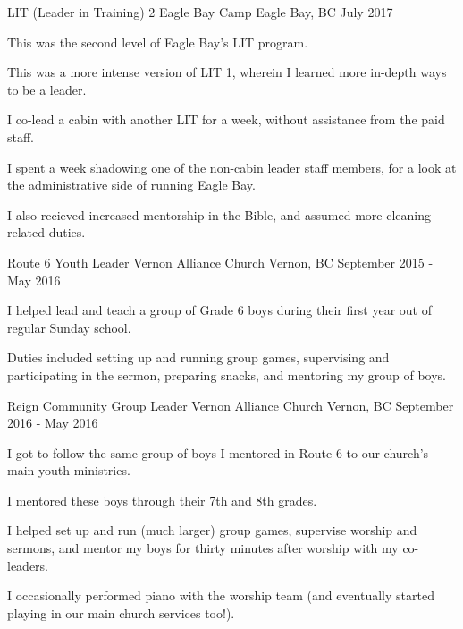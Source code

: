 \begin{cventries}
  \cventry
    {LIT (Leader in Training) 2} %
    {Eagle Bay Camp} %
    {Eagle Bay, BC} %
    {July 2017} %
    {
      \begin{cvitems} %
        \item{This was the second level of Eagle Bay's LIT program.}
        \item{This was a more intense version of LIT 1, wherein I learned more in-depth ways to be a leader.}
        \item{I co-lead a cabin with another LIT for a week, without assistance from the paid staff.}
        \item{I spent a week shadowing one of the non-cabin leader staff members, for a look at the administrative side of running Eagle Bay.}
        \item{I also recieved increased mentorship in the Bible, and assumed more cleaning-related duties.}
      \end{cvitems}
    }

  \cventry
    {Route 6 Youth Leader} %
    {Vernon Alliance Church} %
    {Vernon, BC} %
    {September 2015 - May 2016} %
    {
      \begin{cvitems} %
        \item{I helped lead and teach a group of Grade 6 boys during their first year out of regular Sunday school.}
        \item{Duties included setting up and running group games, supervising and participating in the sermon, preparing snacks, and mentoring my group of boys.}
      \end{cvitems}
    }

  \cventry
    {Reign Community Group Leader} %
    {Vernon Alliance Church} %
    {Vernon, BC} %
    {September 2016 - May 2016} %
    {
      \begin{cvitems} %
        \item{I got to follow the same group of boys I mentored in Route 6 to our church's main youth ministries.}
        \item{I mentored these boys through their 7th and 8th grades.}
        \item{I helped set up and run (much larger) group games, supervise worship and sermons, and mentor my boys for thirty minutes after worship with my co-leaders.}
        \item{I occasionally performed piano with the worship team (and eventually started playing in our main church services too!).}
      \end{cvitems}
    }


\end{cventries}
